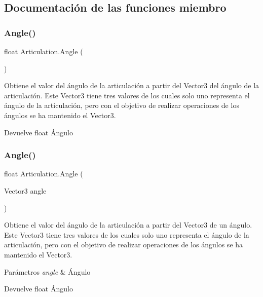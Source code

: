 \subsection{Documentación de las funciones miembro}
\mbox{\label{class_articulation_a530b3282ef1e062b8a752eddb0f624f8}} 
\subsubsection{\texorpdfstring{Angle()}{Angle()}\hspace{0.1cm}{\footnotesize\ttfamily [1/2]}}
{\footnotesize\ttfamily float Articulation.\+Angle (\begin{DoxyParamCaption}{ }\end{DoxyParamCaption})\hspace{0.3cm}{\ttfamily [inline]}}

Obtiene el valor del ángulo de la articulación a partir del Vector3 del ángulo de la articulación. Este Vector3 tiene tres valores de los cuales solo uno representa el ángulo de la articulación, pero con el objetivo de realizar operaciones de los ángulos se ha mantenido el Vector3. \begin{DoxyReturn}{Devuelve}
float Ángulo 
\end{DoxyReturn}
\mbox{\label{class_articulation_a778011e0e6155ccf305808d24cbbda64}} 
\subsubsection{\texorpdfstring{Angle()}{Angle()}\hspace{0.1cm}{\footnotesize\ttfamily [2/2]}}
{\footnotesize\ttfamily float Articulation.\+Angle (\begin{DoxyParamCaption}\item[{Vector3}]{angle }\end{DoxyParamCaption})\hspace{0.3cm}{\ttfamily [inline]}}

Obtiene el valor del ángulo de la articulación a partir del Vector3 de un ángulo. Este Vector3 tiene tres valores de los cuales solo uno representa el ángulo de la articulación, pero con el objetivo de realizar operaciones de los ángulos se ha mantenido el Vector3. 
\begin{DoxyParams}{Parámetros}
{\em angle} & Ángulo \\
\hline
\end{DoxyParams}
\begin{DoxyReturn}{Devuelve}
float Ángulo 
\end{DoxyReturn}
\mbox{\label{class_articulation_a17400ddd138629071a5c240bba86c8f2}} 
